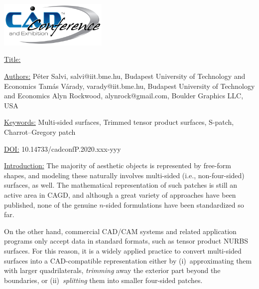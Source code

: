 \documentclass{article}
\begin{document}
{\centering  \includegraphics[width=5.173cm,height=2.193cm]{images/CADconverted-img001.jpg} \par}

\vspace{5pt}
\noindent
\underline{Title:}


\vspace{1em}
\noindent \underline{Authors:}
\newline
P\'eter Salvi, salvi@iit.bme.hu, Budapest University of Technology and Economics \newline
Tam\'as V\'arady, varady@iit.bme.hu, Budapest University of Technology and Economics \newline
Alyn Rockwood, alynrock@gmail.com, Boulder Graphics LLC, USA

\vspace{1em}
\noindent \underline{Keywords:}\newline
Multi-sided surfaces, Trimmed tensor product surfaces, S-patch, Charrot--Gregory patch


\bigskip


\noindent \underline{DOI:} 10.14733/cadconfP.2020.xxx-yyy

\vspace{10pt}
\noindent\underline{Introduction:}\vspace{0.2em}\newline
The majority of aesthetic objects is represented by free-form shapes, and modeling these
naturally involves multi-sided (i.e., non-four-sided) surfaces, as well.  The
mathematical representation of such patches is still an active area in CAGD, and although
a great variety of approaches have been published, none of the genuine $n$-sided
formulations have been standardized so far.

On the other hand, commercial CAD/CAM systems and related application programs only accept
data in standard formats, such as tensor product NURBS surfaces. For this reason, it is a
widely applied practice to convert multi-sided surfaces into a CAD-compatible
representation either by (i)~approximating them with larger quadrilaterals,
\emph{trimming} away the exterior part beyond the boundaries, or (ii)~\emph{splitting}
them into smaller four-sided patches.
\end{document}

